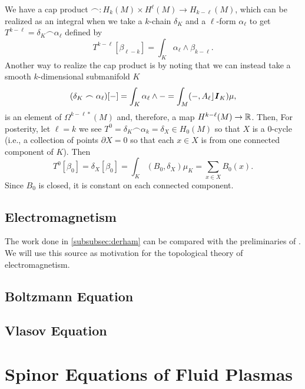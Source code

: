 \documentclass[conf]{new-aiaa}
\begin{document}
We have a cap product $\frown \colon H_k(M)\times H^\ell(M) \to H_{k-\ell}(M)$, which can be realized as an integral when we take a $k$-chain $\delta_K$ and a $\ell$-form $\alpha_\ell$ to get $T^{k-\ell} = \delta_K \frown  \alpha_\ell$ defined by
\begin{equation}
T^{k-\ell}[\beta_{\ell - k}] = \int_{K} \alpha_\ell \wedge \beta_{k-\ell}.
\end{equation}
Another way to realize the cap product is by noting that we can instead take a smooth $k$-dimensional submanifold $K$
\begin{equation}
(\delta_K \frown \alpha_\ell)[-] = \int_K \alpha_\ell \wedge - = \int_M (-,A_\ell \rfloor \boldsymbol{I}_K) \mu,
\end{equation}
is an element of $\Omega^{k-\ell*}(M)$ and, therefore, a map $H^{k-\ell}(M)\to \mathbb{R}$. Then, For posterity, let $\ell = k$ we see $T^0 = \delta_K \frown \alpha_k = \delta_{X} \in H_0(M)$ so that $X$ is a $0$-cycle (i.e., a collection of points $\partial X = 0$ so that each $x\in X$ is from one connected component of $K$). Then
\begin{equation}
T^0[\beta_0] = \delta_{X}[\beta_0] = \int_{K} (B_0 , \delta_X ) \mu_{K} = \sum_{x\in X} B_0(x).
\end{equation}
Since $B_0$ is closed, it is constant on each connected component. 


\subsection{Electromagnetism}

The work done in \cref{subsubsec:derham} can be compared with the preliminaries of \cite{delphenich_axioms_2005}. We will use this source as motivation for the topological theory of electromagnetism. 

\subsection{Boltzmann Equation}

\subsection{Vlasov Equation}

\section{Spinor Equations of Fluid Plasmas}
\end{document}
